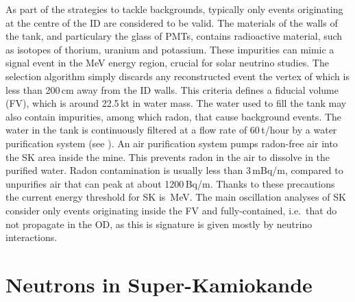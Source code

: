 As part of the strategies to tackle backgrounds, typically only events originating at the centre %
of the ID are considered to be valid.
The materials of the walls of the tank, and particulary the glass of PMTs, contains radioactive material, %
such as isotopes of thorium, uranium and potassium.
These impurities can mimic a signal event in the MeV energy region, crucial for solar neutrino studies.
The selection algorithm simply discards any reconstructed event the vertex of which is less than 200\,cm away from the ID walls.
This criteria defines a fiducial volume (FV), which is around 22.5\,kt in water mass.
The water used to fill the tank may also contain impurities, among which radon, that cause background events.
The water in the tank is continuously filtered at a flow rate of 60\,t/hour by a water purification system (see ).
An air purification system pumps radon-free air into the SK area inside the mine.
This prevents radon in the air to dissolve in the purified water.
Radon contamination is usually less than 3\,mBq/m, compared to unpurifies air that can peak %
at about 1200\,Bq/m.
Thanks to these precautions the current energy threshold for SK is \,MeV.
The main oscillation analyses of SK consider only events originating inside the FV and fully-contained, %
i.e.\ that do not propagate in the OD, as this is signature is given mostly by neutrino interactions.

\section{Neutrons in Super-Kamiokande}
\label{sec:sk_neutron}

